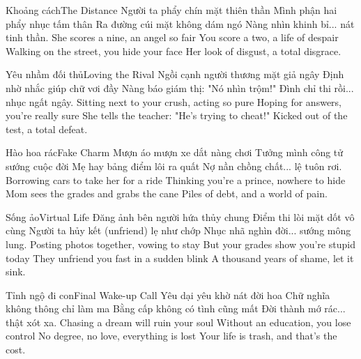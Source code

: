\begin{tutuyetbox}{Khoảng cách}{The Distance}
Người ta phẩy chín mặt thiên thần
Mình phận hai phẩy nhục tấm thân
Ra đường cúi mặt không dám ngó
Nàng nhìn khinh bỉ... nát tinh thần.
\tcblower
She scores a nine, an angel so fair
You score a two, a life of despair
Walking on the street, you hide your face
Her look of disgust, a total disgrace.
\end{tutuyetbox}

\begin{tutuyetbox}{Yêu nhầm đối thủ}{Loving the Rival}
Ngồi cạnh người thương mặt giả ngây
Định nhờ nhắc giúp chữ vơi đầy
Nàng báo giám thị: "Nó nhìn trộm!"
Đình chỉ thi rồi... nhục ngất ngây.
\tcblower
Sitting next to your crush, acting so pure
Hoping for answers, you're really sure
She tells the teacher: "He's trying to cheat!"
Kicked out of the test, a total defeat.
\end{tutuyetbox}

\begin{tutuyetbox}{Hào hoa rác}{Fake Charm}
Mượn áo mượn xe dắt nàng chơi
Tưởng mình công tử sướng cuộc đời
Mẹ hay bảng điểm lôi ra quất
Nợ nần chồng chất... lệ tuôn rơi.
\tcblower
Borrowing cars to take her for a ride
Thinking you're a prince, nowhere to hide
Mom sees the grades and grabs the cane
Piles of debt, and a world of pain.
\end{tutuyetbox}

\begin{tutuyetbox}{Sống ảo}{Virtual Life}
Đăng ảnh bên người hứa thủy chung
Điểm thi lòi mặt dốt vô cùng
Người ta hủy kết (unfriend) lẹ như chớp
Nhục nhã nghìn đời... sướng mông lung.
\tcblower
Posting photos together, vowing to stay
But your grades show you're stupid today
They unfriend you fast in a sudden blink
A thousand years of shame, let it sink.
\end{tutuyetbox}

\begin{tutuyetbox}{Tỉnh ngộ đi con}{Final Wake-up Call}
Yêu dại yêu khờ nát đời hoa
Chữ nghĩa không thông chỉ làm ma
Bằng cấp không có tình cũng mất
Đời thành mớ rác... thật xót xa.
\tcblower
Chasing a dream will ruin your soul
Without an education, you lose control
No degree, no love, everything is lost
Your life is trash, and that's the cost.
\end{tutuyetbox}



